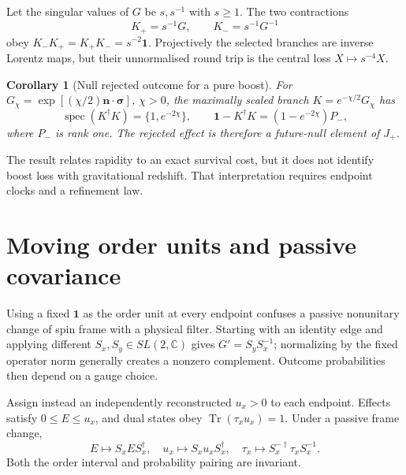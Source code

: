 \documentclass[11pt]{article}
\newtheorem{corollary}[theorem]{Corollary}
\theoremstyle{remark}
\newcommand{\Tr}{\operatorname{Tr}}
\newcommand{\id}{\mathbf 1}
\begin{document}
Let the singular values of $G$ be $s,s^{-1}$ with $s\geq1$.  The two contractions
\begin{equation}
 K_+=s^{-1}G,\qquad K_-=s^{-1}G^{-1}
 \label{eq:two-way-filters}
\end{equation}
obey $K_-K_+=K_+K_-=s^{-2}\id$.  Projectively the selected branches are inverse Lorentz
maps, but their unnormalised round trip is the central loss $X\mapsto s^{-4}X$.

\begin{corollary}[Null rejected outcome for a pure boost]
\label{cor:null-failure}
For
$G_\chi=\exp[(\chi/2)\bm n\cdot\bm\sigma]$, $\chi>0$, the maximally scaled branch
$K=e^{-\chi/2}G_\chi$ has
\begin{equation}
 \operatorname{spec}(K^\dagger K)=\{1,e^{-2\chi}\},\qquad
 \id-K^\dagger K=(1-e^{-2\chi})P_-,
 \label{eq:null-failure}
\end{equation}
where $P_-$ is rank one.  The rejected effect is therefore a future-null element of
$J_+$.
\end{corollary}

The result relates rapidity to an exact survival cost, but it does not identify boost loss
with gravitational redshift.  That interpretation requires endpoint clocks and a
refinement law.

\section{Moving order units and passive covariance}

Using a fixed $\id$ as the order unit at every endpoint confuses a passive nonunitary
change of spin frame with a physical filter.  Starting with an identity edge and applying
different $S_x,S_y\in SL(2,\mathbb C)$ gives $G'=S_yS_x^{-1}$; normalizing by the fixed
operator norm generally creates a nonzero complement.  Outcome probabilities then depend
on a gauge choice.

Assign instead an independently reconstructed $u_x>0$ to each endpoint.  Effects satisfy
$0\leq E\leq u_x$, and dual states obey $\Tr(\tau_xu_x)=1$.  Under a passive frame change,
\begin{equation}
 E\mapsto S_xES_x^\dagger,\quad
 u_x\mapsto S_xu_xS_x^\dagger,\quad
 \tau_x\mapsto S_x^{-\dagger}\tau_xS_x^{-1}.
 \label{eq:order-unit-frame}
\end{equation}
Both the order interval and probability pairing are invariant.
\end{document}
